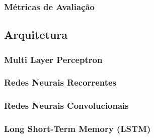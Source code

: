         \subsubsection{Métricas de Avaliação}
            
    \subsection{Arquitetura}
        \subsubsection{Multi Layer Perceptron}
        \subsubsection{Redes Neurais Recorrentes}
        \subsubsection{Redes Neurais Convolucionais}
        \subsubsection{Long Short-Term Memory (LSTM)}
